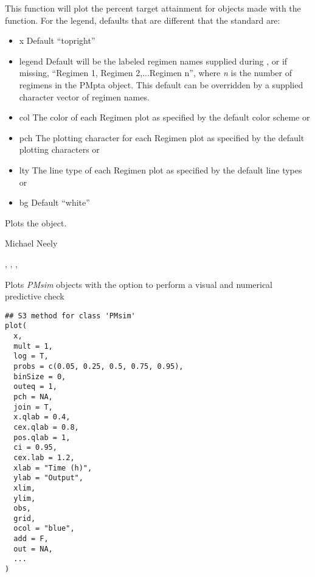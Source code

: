 \documentclass[a4paper]{book}
\begin{document}
\begin{Details}\relax
This function will plot the percent target attainment for objects made with the  function.
For the legend, defaults that are different that the standard are:
\begin{itemize}

\item{} x Default ``topright''
\item{} legend Default will be the labeled regimen names supplied during , 
or if missing, ``Regimen 1, Regimen 2,...Regimen n'', where \emph{n} is the number of 
regimens in the PMpta object.  
This default can be overridden by a supplied character vector of regimen names.
\item{} col The color of each Regimen plot as specified by the default color scheme or 
\item{} pch The plotting character for each Regimen plot as specified by the default plotting characters or 
\item{} lty The line type of each Regimen plot as specified by the default line types or 
\item{} bg Default ``white''

\end{itemize}

\end{Details}
%
\begin{Value}
Plots the object.
\end{Value}
%
\begin{Author}\relax
Michael Neely
\end{Author}
%
\begin{SeeAlso}\relax
{}, , , 
\end{SeeAlso}
%
\begin{Description}\relax
Plots \emph{PMsim} objects with the option to perform a visual and numerical predictive check
\end{Description}
%
\begin{Usage}
\begin{verbatim}
## S3 method for class 'PMsim'
plot(
  x,
  mult = 1,
  log = T,
  probs = c(0.05, 0.25, 0.5, 0.75, 0.95),
  binSize = 0,
  outeq = 1,
  pch = NA,
  join = T,
  x.qlab = 0.4,
  cex.qlab = 0.8,
  pos.qlab = 1,
  ci = 0.95,
  cex.lab = 1.2,
  xlab = "Time (h)",
  ylab = "Output",
  xlim,
  ylim,
  obs,
  grid,
  ocol = "blue",
  add = F,
  out = NA,
  ...
)
\end{verbatim}
\end{Usage}
\end{document}
